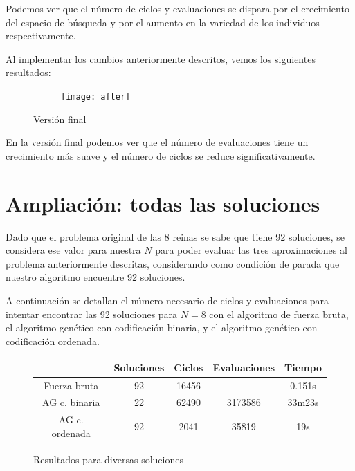 \documentclass[12pt]{article}
\begin{document}
Podemos ver que el número de ciclos y evaluaciones se dispara por el crecimiento del espacio de búsqueda y por el aumento en la variedad de los individuos respectivamente.

Al implementar los cambios anteriormente descritos, vemos los siguientes resultados:

\begin{figure}[h]
    \center
    \begin{subfigure}{.85\textwidth}
        \texttt{[image: after]}
    \end{subfigure}
    \caption{Versión final}
\end{figure}

En la versión final podemos ver que el número de evaluaciones tiene un crecimiento más suave y el número de ciclos se reduce significativamente.

\section{Ampliación: todas las soluciones}

Dado que el problema original de las 8 reinas se sabe que tiene 92 soluciones, se considera ese valor para nuestra $N$ para poder evaluar las tres aproximaciones al problema anteriormente descritas, considerando como condición de parada que nuestro algoritmo encuentre 92 soluciones.

A continuación se detallan el número necesario de ciclos y evaluaciones para intentar encontrar las 92 soluciones para $N=8$ con el algoritmo de fuerza bruta, el algoritmo genético con codificación binaria, y el algoritmo genético con codificación ordenada.

\begin{figure}[h]
    \center
    {
    \begin{tabular}{|c c c c c|}
        \hline
        \rowcolor{gray!10} & Soluciones & Ciclos & Evaluaciones & Tiempo \\
        \hline
        Fuerza bruta & 92 & 16456 & - & 0.151s\\ 
        \hline
        AG c. binaria & 22 & 62490 & 3173586 & 33m23s\\
        \hline
        AG c. ordenada & 92 & 2041 & 35819  & 19s\\
        \hline
    \end{tabular}
    }
    \caption{Resultados para diversas soluciones}
\end{figure}
\end{document}
